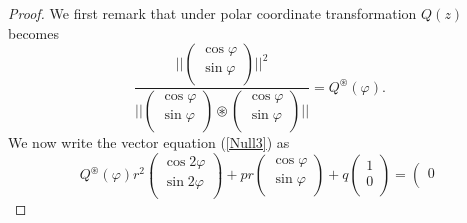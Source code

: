 \documentclass{amsart}
\theoremstyle{definition}
\theoremstyle{remark}
\numberwithin{equation}{section}
\begin{document}
\begin{proof}
We first remark that under polar coordinate transformation $Q(z)$ becomes
\[  \frac{||\left(
                  \begin{array}{c}
                    \cos\varphi \\
                    \sin\varphi \\
                  \end{array}
                \right)
                ||^2}{||\left(
                  \begin{array}{c}
                    \cos\varphi \\
                    \sin\varphi \\
                  \end{array}
                \right)\circledast \left(
                  \begin{array}{c}
                    \cos\varphi \\
                    \sin\varphi \\
                  \end{array}
                \right)
||}=Q^{\circledast
}(\varphi).\]
We now
write the vector equation (\ref{Null3}) as
\[Q^{\circledast}(\varphi)r^2\left(
                      \begin{array}{c}
                        \cos2\varphi \\
                        \sin2\varphi \\
                      \end{array}
                    \right)
+pr\left(
                                  \begin{array}{c}
                                    \cos\varphi \\
                        \sin\varphi \\
                                  \end{array}
                                \right)+q\left(
                                          \begin{array}{c}
                                            1 \\
                                            0 \\
                                          \end{array}
                                        \right)=\left(
                                                 \begin{array}{c}
                                                   0 \\

\end{array}\]
\end{proof}
\end{document}
